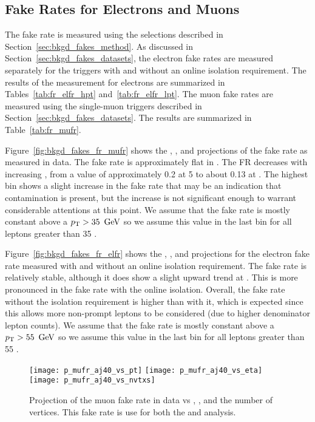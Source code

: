 \subsection{Fake Rates for Electrons and Muons}
\label {sec:bkgd_fakes_fr}
The fake rate is measured using the selections described
in Section~\ref{sec:bkgd_fakes_method}. As discussed in
Section~\ref{sec:bkgd_fakes_datasets}, the electron fake rates are
measured separately for the triggers with and without an online
isolation requirement. The results of the measurement for electrons are
summarized in Tables~\ref{tab:fr_elfr_hpt} and~\ref{tab:fr_elfr_lpt}.
The muon fake rates are measured using the single-muon triggers described
in Section~\ref{sec:bkgd_fakes_datasets}. The results are summarized in
Table~\ref{tab:fr_mufr}.

Figure~\ref{fig:bkgd_fakes_fr_mufr} shows the \pt, \aeta, and \nvtx projections
of the fake rate as measured in data. The fake rate is approximately flat in
\aeta. The FR decreases with increasing \pt, from a value of approximately 0.2
at 5 \GeV to about 0.13 at \hpt. The highest \pt bin shows a slight increase
in the fake rate that may be an indication that \W contamination is present,
but the increase is not significant enough to warrant considerable attentions
at this point. We assume that the fake rate is mostly constant above a $p_{\mathrm{T}} >
35~\,\text{Ge\hspace{-.08em}V}$ so we assume this value in the last bin for all leptons greater than 35
\GeV.

Figure~\ref{fig:bkgd_fakes_fr_elfr} shows the \pt, \aeta, and \nvtx projections
for the electron fake rate measured with and without an online isolation
requirement. The fake rate is relatively stable, although it does show a slight
upward trend at \hpt. This is more pronounced in the fake rate with the online
isolation. Overall, the fake rate without the isolation requirement is higher
than with it, which is expected since this allows more non-prompt leptons to be
considered (due to higher denominator lepton counts). We assume that the fake
rate is mostly constant above a $p_{\mathrm{T}} > 55~\,\text{Ge\hspace{-.08em}V}$ so we assume this value in the
last bin for all leptons greater than 55 \GeV.
\begin{figure}[!hbt]
\begin{center}
\texttt{[image: p\_mufr\_aj40\_vs\_pt]}
\texttt{[image: p\_mufr\_aj40\_vs\_eta]}
\texttt{[image: p\_mufr\_aj40\_vs\_nvtxs]}
\caption[Muon Fake Rate vs \pt, \aeta, and number of vertices]
{\label{fig:bkgd_fakes_fr_mufr_aj}
Projection of the muon fake rate in data vs \aeta, \pt, and the number of
vertices. This fake rate is use for both the \hpt and \lpt analysis.
}
\end{center}
\end{figure}


